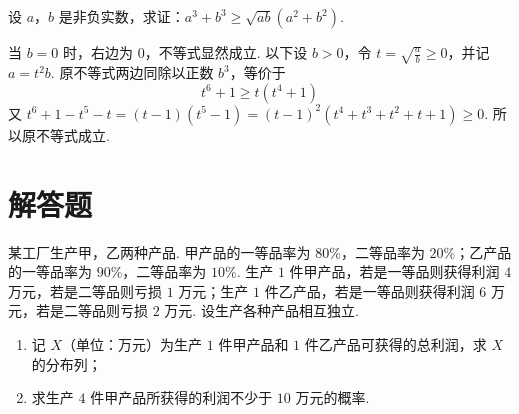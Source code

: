 \reuseproblemnumber
\begin{problem}[D]
设 \(a\)，\(b\) 是非负实数，求证：\(a^3+b^3\geqslant \sqrt{ab}\left(a^2+b^2\right)\).
\end{problem}

\begin{solution}
当 \(b=0\) 时，右边为 \(0\)，不等式显然成立. 以下设 \(b>0\)，令 \(t=\sqrt{\frac{a}{b}}\geqslant0\)，并记 \(a=t^2b\).
原不等式两边同除以正数 \(b^3\)，等价于
\[
t^6+1\geqslant t(t^4+1)
\]
又 \(t^6+1-t^5-t=(t-1)(t^5-1)=(t-1)^2\left(t^4+t^3+t^2+t+1\right)\geqslant0\).
所以原不等式成立.
\end{solution}

\section{解答题}

\begin{problem}
某工厂生产甲，乙两种产品. 甲产品的一等品率为 \(80\%\)，二等品率为 \(20\%\)；乙产品的一等品率为 \(90\%\)，二等品率为 \(10\%\). 生产 \(1\) 件甲产品，若是一等品则获得利润 \(4\) 万元，若是二等品则亏损 \(1\) 万元；生产 \(1\) 件乙产品，若是一等品则获得利润 \(6\) 万元，若是二等品则亏损 \(2\) 万元. 设生产各种产品相互独立.

\begin{enumerate}
\item 记 \(X\)（单位：万元）为生产 \(1\) 件甲产品和 \(1\) 件乙产品可获得的总利润，求 \(X\) 的分布列；
\item 求生产 \(4\) 件甲产品所获得的利润不少于 \(10\) 万元的概率.
\end{enumerate}
\end{problem}

